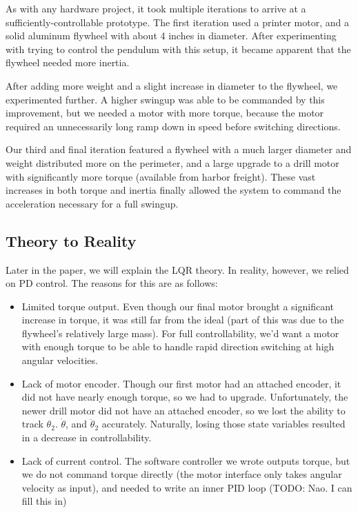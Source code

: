 \documentclass[conference]{IEEEtran}
\begin{document}
As with any hardware project, it
took multiple iterations to arrive at a sufficiently-controllable prototype. The
first iteration used a printer motor, and a solid aluminum flywheel with about 4
inches in diameter.  After experimenting with trying to control the pendulum
with this setup, it became apparent that the flywheel needed more inertia.

After adding more weight and a slight increase in diameter to the
flywheel, we experimented further. A higher swingup was able to be commanded by
this improvement, but we needed a motor with more torque, because the motor
required an unnecessarily long ramp down in speed before switching directions.

Our third and final iteration featured a flywheel with a much larger
diameter and weight distributed more on the perimeter, and a large upgrade to a
drill motor with significantly more torque (available from harbor freight).
These vast increases in both torque and inertia finally allowed the system to
command the acceleration necessary for a full swingup.

\subsection{Theory to Reality}

Later in the paper, we will explain the LQR theory. In reality, however, we
relied on PD control. The reasons for this are as follows: \begin{itemize} \item
    Limited torque output. Even though our final motor brought a significant
    increase in torque, it was still far from the ideal (part of this was due to
    the flywheel's relatively large mass). For full controllability, we'd want a
    motor with enough torque to be able to handle rapid direction switching at
    high angular velocities.  \item Lack of motor encoder. Though our first
    motor had an attached encoder, it did not have nearly enough torque, so we
    had to upgrade. Unfortunately, the newer drill motor did not have an
    attached encoder, so we lost the ability to track $\theta_2$.
    $\dot{\theta}$, and $\ddot{\theta}_2$ accurately. Naturally, losing those
    state variables resulted in a decrease in controllability.  \item Lack of
    current control. The software controller we wrote outputs torque, but we do
    not command torque directly (the motor interface only takes angular velocity
    as input), and needed to write an inner PID loop  (TODO: Nao. I can fill
    this in) \end{itemize}
\end{document}

